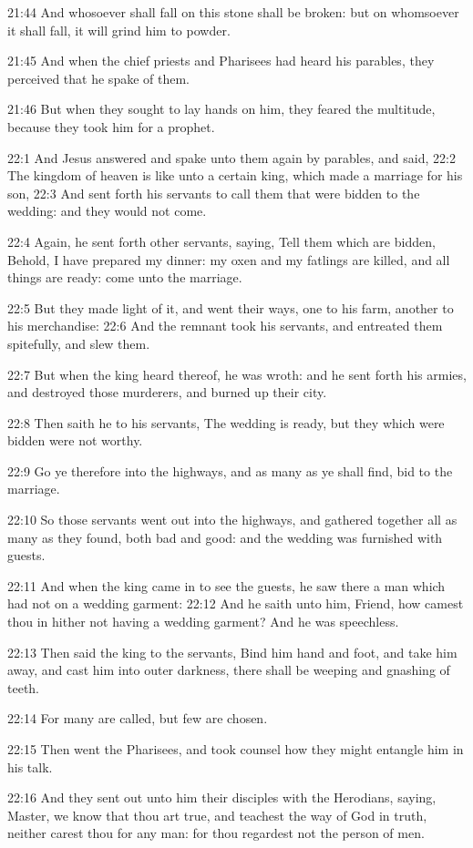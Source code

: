 21:44 And whosoever shall fall on this stone shall be broken: but on
whomsoever it shall fall, it will grind him to powder.

21:45 And when the chief priests and Pharisees had heard his parables,
they perceived that he spake of them.

21:46 But when they sought to lay hands on him, they feared the
multitude, because they took him for a prophet.

22:1 And Jesus answered and spake unto them again by parables, and
said, 22:2 The kingdom of heaven is like unto a certain king, which
made a marriage for his son, 22:3 And sent forth his servants to call
them that were bidden to the wedding: and they would not come.

22:4 Again, he sent forth other servants, saying, Tell them which are
bidden, Behold, I have prepared my dinner: my oxen and my fatlings are
killed, and all things are ready: come unto the marriage.

22:5 But they made light of it, and went their ways, one to his farm,
another to his merchandise: 22:6 And the remnant took his servants,
and entreated them spitefully, and slew them.

22:7 But when the king heard thereof, he was wroth: and he sent forth
his armies, and destroyed those murderers, and burned up their city.

22:8 Then saith he to his servants, The wedding is ready, but they
which were bidden were not worthy.

22:9 Go ye therefore into the highways, and as many as ye shall find,
bid to the marriage.

22:10 So those servants went out into the highways, and gathered
together all as many as they found, both bad and good: and the wedding
was furnished with guests.

22:11 And when the king came in to see the guests, he saw there a man
which had not on a wedding garment: 22:12 And he saith unto him,
Friend, how camest thou in hither not having a wedding garment? And he
was speechless.

22:13 Then said the king to the servants, Bind him hand and foot, and
take him away, and cast him into outer darkness, there shall be
weeping and gnashing of teeth.

22:14 For many are called, but few are chosen.

22:15 Then went the Pharisees, and took counsel how they might
entangle him in his talk.

22:16 And they sent out unto him their disciples with the Herodians,
saying, Master, we know that thou art true, and teachest the way of
God in truth, neither carest thou for any man: for thou regardest not
the person of men.


